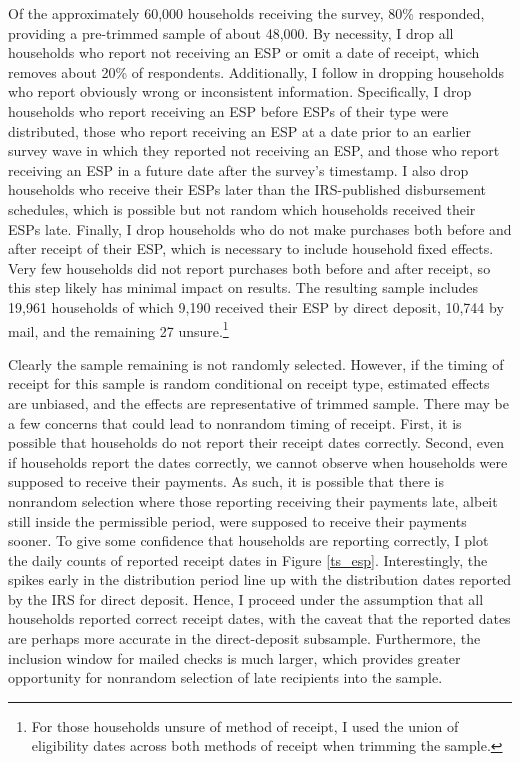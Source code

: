 \documentclass[12pt]{article}
\begin{document}
Of the approximately 60,000 households receiving the survey, 80\% responded, providing a pre-trimmed sample of about 48,000.
By necessity, I drop all households who report not receiving an ESP or omit a date of receipt, which removes about 20\% of respondents.
Additionally, I follow \textcite{broda2014economic} in dropping households who report obviously wrong or inconsistent information.
Specifically, I drop households who report receiving an ESP before ESPs of their type were distributed, those who report receiving an ESP at a date prior to an earlier survey wave in which they reported not receiving an ESP, and those who report receiving an ESP in a future date after the survey's timestamp.
I also drop households who receive their ESPs later than the IRS-published disbursement schedules, which is possible but not random which households received their ESPs late.
Finally, I drop households who do not make purchases both before and after receipt of their ESP, which is necessary to include household fixed effects.
Very few households did not report purchases both before and after receipt, so this step likely has minimal impact on results.
The resulting sample includes 19,961 households of which 9,190 received their ESP by direct deposit, 10,744 by mail, and the remaining 27 unsure.\footnote{For those households unsure of method of receipt, I used the union of eligibility dates across both methods of receipt when trimming the sample.}

Clearly the sample remaining is not randomly selected.
However, if the timing of receipt for this sample is random conditional on receipt type, estimated effects are unbiased, and the effects are representative of trimmed sample.
There may be a few concerns that could lead to nonrandom timing of receipt.
First, it is possible that households do not report their receipt dates correctly.
Second, even if households report the dates correctly, we cannot observe when households were supposed to receive their payments.
As such, it is possible that there is nonrandom selection where those reporting receiving their payments late, albeit still inside the permissible period, were supposed to receive their payments sooner.
To give some confidence that households are reporting correctly, I plot the daily counts of reported receipt dates in Figure \ref{ts_esp}.
Interestingly, the spikes early in the distribution period line up with the distribution dates reported by the IRS for direct deposit.
Hence, I proceed under the assumption that all households reported correct receipt dates, with the caveat that the reported dates are perhaps more accurate in the direct-deposit subsample.
Furthermore, the inclusion window for mailed checks is much larger, which provides greater opportunity for nonrandom selection of late recipients into the sample.
\end{document}
